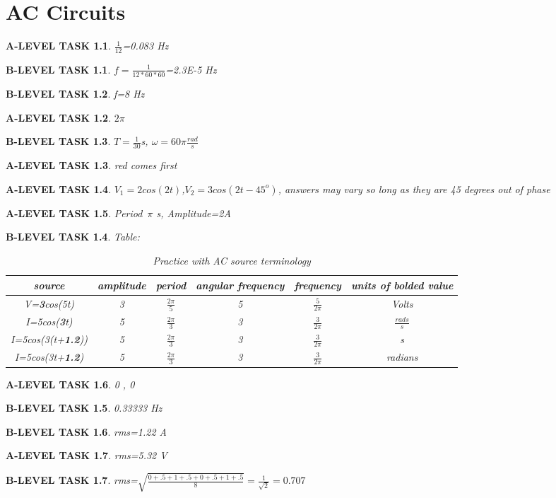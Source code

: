 \documentclass{book}
\numberwithin{equation}{section}
\newtheorem{alevel}{A-LEVEL TASK}
\newtheorem{blevel}{B-LEVEL TASK}
\theoremstyle{definition}
\begin{document}
\chapter{AC Circuits}
\begin{alevel}$\frac{1}{12}$=0.083 Hz\end{alevel}
\begin{blevel}$f=\frac{1}{12*60*60}$=2.3E-5 Hz\end{blevel}
\begin{blevel}f=8 Hz\end{blevel}
\begin{alevel}$2\pi$\end{alevel}
\begin{blevel}$T=\frac{1}{30}$s, $\omega=60\pi \frac{rad}{s}$\end{blevel}
\begin{alevel}red comes first\end{alevel}
\begin{alevel}$V_1=2cos(2t)$,$V_2=3cos(2t-45^o)$, answers may vary so long as they are 45 degrees out of phase\end{alevel}
\begin{alevel}Period~$\pi$ s, Amplitude=2A\end{alevel}

\begin{blevel} Table:\par
\begin{table}[H]
\begin{center}
\begin{tabular}{|c|c|c|c|c|c|} \hline
source&amplitude	&period	&angular frequency	&frequency &units of bolded value \\ \hline
V=\textbf{3}cos(5t)&3		&$\frac{2\pi}{5}$&5&$\frac{5}{2\pi}$&Volts \\ \hline
I=5cos(\textbf{3}t)&5		&$\frac{2\pi}{3}$&3&$\frac{3}{2\pi}$&$\frac{rads}{s}$ \\ \hline
I=5cos(3(t+\textbf{1.2}))&5		&$\frac{2\pi}{3}$&3&$\frac{3}{2\pi}$&s \\ \hline
I=5cos(3t+\textbf{1.2})&5		&$\frac{2\pi}{3}$&3&$\frac{3}{2\pi}$&radians \\ \hline
\end{tabular}
\caption{Practice with AC source terminology}
\label{T:AC1}
\end{center}
\end{table}
\end{blevel}

\begin{alevel}0 , 0\end{alevel}
\begin{blevel}0.33333 Hz\end{blevel}
\begin{blevel}rms=1.22 A\end{blevel}
\begin{alevel}rms=5.32 V\end{alevel}
\begin{blevel}rms=$\sqrt{\frac{0+.5+1+.5+0+.5+1+.5}{8}}=\frac{1}{\sqrt{2}}=0.707$\end{blevel}
\end{document}
